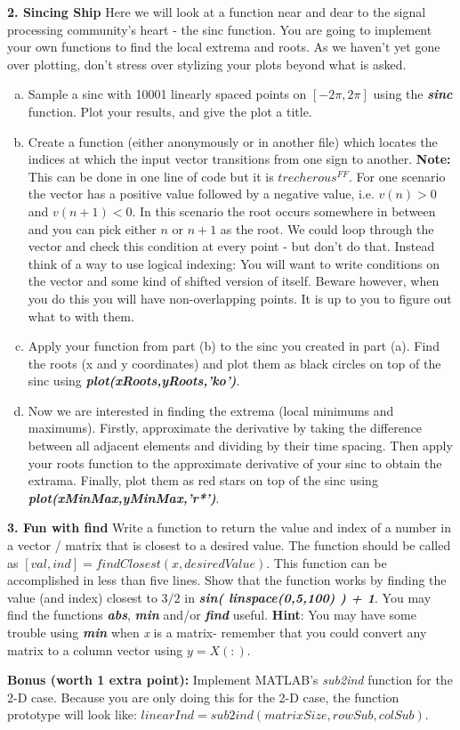 \documentclass[11pt]{article}
\begin{document}
\noindent
\newline
\textbf{2. Sincing Ship} 
Here we will look at a function near and dear to the signal processing community's heart -
the sinc function.
You are going to implement your own functions to find the local extrema and roots.
As we haven't yet gone over plotting,
don't stress over stylizing your plots beyond what is asked.

\begin{enumerate}[a.]
    \item Sample a sinc with 10001 linearly spaced points on $[-2\pi, 2\pi]$ using 
    the \textbf{\textit{sinc}} function. Plot your results, and give the plot a title.

    \item Create a function (either anonymously or in another file) which locates
    the indices at which the input vector transitions from one sign to another.
    \textbf{Note:} This can be done in one line of code but it is $trecherous^{FF}$.
    For one scenario the vector has a positive value followed by a negative value,
    i.e. $v(n) > 0$ and $v(n+1) < 0$. 
    In this scenario the root occurs somewhere in between and you can pick either $n$ or $n+1$
    as the root.
    We could loop through the vector and check this condition at every point - but don't do that.
    Instead think of a way to use logical indexing:
    You will want to write conditions on the vector and some kind of shifted version of itself.
    Beware however, when you do this you will have non-overlapping points.
    It is up to you to figure out what to with them.

    \item Apply your function from part (b) to the sinc you created in part (a).
    Find the roots (x and y coordinates) and plot them as black circles
    on top of the sinc using \textbf{\textit{plot(xRoots,yRoots,'ko')}}. 

    \item Now we are interested in finding the extrema
    (local minimums and maximums).
    Firstly, approximate the derivative by taking the difference between all adjacent elements
    and dividing by their time spacing.
    Then apply your roots function to the approximate derivative of your sinc to obtain the extrama.
    Finally, plot them as red stars on top of the sinc using \textbf{\textit{plot(xMinMax,yMinMax,'r*')}}.
\end{enumerate}


\noindent
\newline
\textbf{3. Fun with find}
Write a function to return the value and index of a number in a 
vector / matrix that is closest to a desired value.
The function should be called as $[val, ind] = findClosest(x, desiredValue)$.
This function can be accomplished in less than five lines.
Show that the function works by finding the value (and index) closest to $3/2$
in \textbf{\textit{sin( linspace(0,5,100) ) + 1}}.
You may find the functions \textbf{\textit{abs}}, \textbf{\textit{min}} and/or \textbf{\textit{find}} useful.
\textbf{Hint}: You may have some trouble using \textbf{\textit{min}} when \textit{x} is a matrix-
remember that you could convert any matrix to a column vector using $y = X(:)$.

\noindent
\newline
\textbf{Bonus (worth 1 extra point):}
Implement MATLAB's \textit{sub2ind} function for the 2-D case.
Because you are only doing this for the 2-D case,
the function prototype will look like: $linearInd = sub2ind(matrixSize, rowSub, colSub)$.
\end{document}
